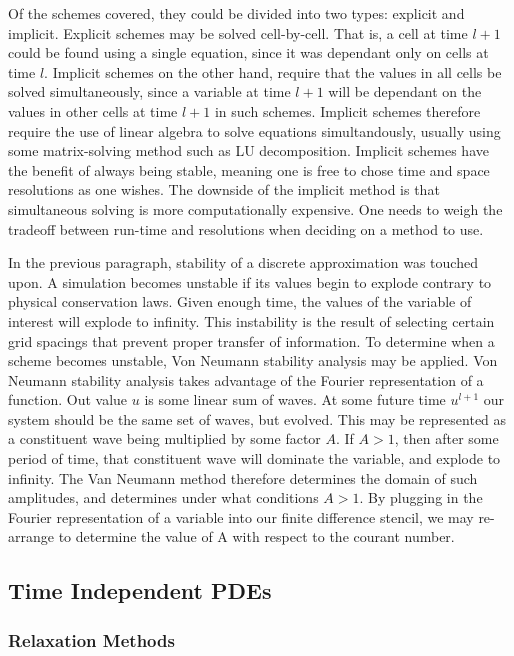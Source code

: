 \documentclass[twocolumn]{article}
\begin{document}
Of the schemes covered, they could be divided into two types: explicit and implicit. Explicit schemes may be solved cell-by-cell. That is, a cell at time $l+1$ could be found using a single equation, since it was dependant only on cells at time $l$. Implicit schemes on the other hand, require that the values in all cells be solved simultaneously, since a variable at time $l+1$ will be dependant on the values in other cells at time $l+1$ in such schemes. Implicit schemes therefore require the use of linear algebra to solve equations simultandously, usually using some matrix-solving method such as LU decomposition. Implicit schemes have the benefit of always being stable, meaning one is free to chose time and space resolutions as one wishes. The downside of the implicit method is that simultaneous solving is more computationally expensive. One needs to weigh the tradeoff between run-time and resolutions when deciding on a method to use. 

In the previous paragraph, stability of a discrete approximation was touched upon. A simulation becomes unstable if its values begin to explode contrary to physical conservation laws. Given enough time, the values of the variable of interest will explode to infinity. This instability is the result of selecting certain grid spacings that prevent proper transfer of information. To determine when a scheme becomes unstable, Von Neumann stability analysis may be applied. Von Neumann stability analysis takes advantage of the Fourier representation of a function. Out value $u$ is some linear sum of waves. At some future time $u^{l+1}$ our system should be the same set of waves, but evolved. This may be represented as a constituent wave being multiplied by some factor $A$. If $A>1$, then after some period of time, that constituent wave will dominate the variable, and explode to infinity. The Van Neumann method therefore determines the domain of such amplitudes, and determines under what conditions $A>1$. By plugging in the Fourier representation of a variable into our finite difference stencil, we may re-arrange to determine the value of A with respect to the courant number.


\subsection{Time Independent PDEs}
\subsubsection{Relaxation Methods}
\end{document}
